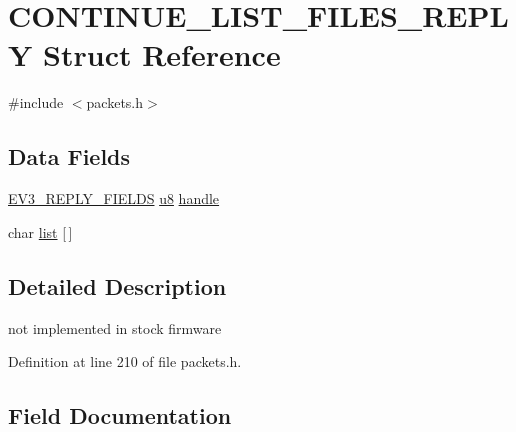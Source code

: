 \hypertarget{struct_c_o_n_t_i_n_u_e___l_i_s_t___f_i_l_e_s___r_e_p_l_y}{}\section{C\+O\+N\+T\+I\+N\+U\+E\+\_\+\+L\+I\+S\+T\+\_\+\+F\+I\+L\+E\+S\+\_\+\+R\+E\+P\+L\+Y Struct Reference}
\label{struct_c_o_n_t_i_n_u_e___l_i_s_t___f_i_l_e_s___r_e_p_l_y}


{\ttfamily \#include $<$packets.\+h$>$}

\subsection*{Data Fields}
\begin{DoxyCompactItemize}
\item 
\hyperlink{packets_8h_a382c165d520d462ac8f0c88e2a1970cb}{E\+V3\+\_\+\+R\+E\+P\+L\+Y\+\_\+\+F\+I\+E\+L\+D\+S} \hyperlink{defs_8h_a92c50087ca0e64fa93fc59402c55f8ca}{u8} \hyperlink{struct_c_o_n_t_i_n_u_e___l_i_s_t___f_i_l_e_s___r_e_p_l_y_a2f1e90eb35c05582c8b60d001920036a}{handle}
\item 
char \hyperlink{struct_c_o_n_t_i_n_u_e___l_i_s_t___f_i_l_e_s___r_e_p_l_y_aff445b895fa0846e460f0c83e186647d}{list} \mbox{[}$\,$\mbox{]}
\end{DoxyCompactItemize}


\subsection{Detailed Description}
not implemented in stock firmware 

Definition at line 210 of file packets.\+h.



\subsection{Field Documentation}
\hypertarget{struct_c_o_n_t_i_n_u_e___l_i_s_t___f_i_l_e_s___r_e_p_l_y_a2f1e90eb35c05582c8b60d001920036a}{}
